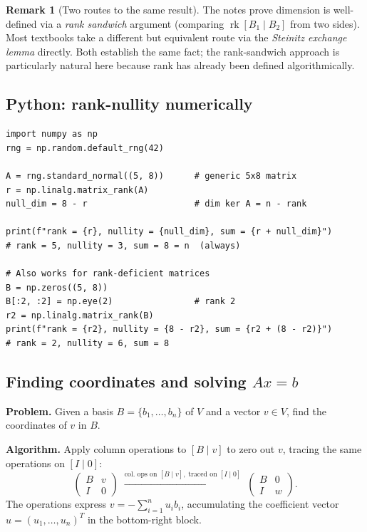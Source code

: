 \documentclass[11pt]{article}
\theoremstyle{definition}
\newtheorem{remark}{Remark}[section]
\theoremstyle{plain}
\begin{document}
\begin{remark}[Two routes to the same result]
  The notes prove dimension is well-defined via a \emph{rank sandwich}
  argument (comparing $\operatorname{rk}[B_1\mid B_2]$ from two sides).
  Most textbooks take a different but equivalent route via the
  \emph{Steinitz exchange lemma} directly.  Both establish the same fact;
  the rank-sandwich approach is particularly natural here because rank has
  already been defined algorithmically.
\end{remark}

\subsection{Python: rank-nullity numerically}
\begin{lstlisting}
import numpy as np
rng = np.random.default_rng(42)

A = rng.standard_normal((5, 8))      # generic 5x8 matrix
r = np.linalg.matrix_rank(A)
null_dim = 8 - r                     # dim ker A = n - rank

print(f"rank = {r}, nullity = {null_dim}, sum = {r + null_dim}")
# rank = 5, nullity = 3, sum = 8 = n  (always)

# Also works for rank-deficient matrices
B = np.zeros((5, 8))
B[:2, :2] = np.eye(2)                # rank 2
r2 = np.linalg.matrix_rank(B)
print(f"rank = {r2}, nullity = {8 - r2}, sum = {r2 + (8 - r2)}")
# rank = 2, nullity = 6, sum = 8
\end{lstlisting}

\subsection{Finding coordinates and solving $Ax = b$}

\textbf{Problem.} Given a basis $B = \{b_1,\ldots,b_n\}$ of $V$ and a vector
$v \in V$, find the coordinates of $v$ in $B$.

\medskip\noindent
\textbf{Algorithm.} Apply column operations to $[B \mid v]$ to zero out $v$,
tracing the same operations on $[I \mid 0]$:
\[
  \left(\begin{array}{c|c} B & v \\ \hline I & 0 \end{array}\right)
  \;\xrightarrow{\text{col.\ ops on }[B\mid v],\;\text{traced on }[I\mid 0]}\;
  \left(\begin{array}{c|c} B & 0 \\ \hline I & w \end{array}\right).
\]
The operations express $v = -\sum_{i=1}^n u_i b_i$, accumulating the
coefficient vector $u = (u_1,\ldots,u_n)^T$ in the bottom-right block.
\end{document}
